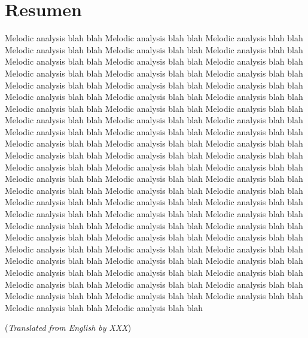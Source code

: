 
\chapter{Resumen}

Melodic analysis blah blah Melodic analysis blah blah Melodic analysis blah blah Melodic analysis blah blah Melodic analysis blah blah Melodic analysis blah blah Melodic analysis blah blah Melodic analysis blah blah Melodic analysis blah blah Melodic analysis blah blah Melodic analysis blah blah Melodic analysis blah blah Melodic analysis blah blah Melodic analysis blah blah Melodic analysis blah blah Melodic analysis blah blah Melodic analysis blah blah Melodic analysis blah blah Melodic analysis blah blah Melodic analysis blah blah Melodic analysis blah blah Melodic analysis blah blah Melodic analysis blah blah Melodic analysis blah blah Melodic analysis blah blah Melodic analysis blah blah Melodic analysis blah blah Melodic analysis blah blah Melodic analysis blah blah Melodic analysis blah blah Melodic analysis blah blah Melodic analysis blah blah Melodic analysis blah blah Melodic analysis blah blah Melodic analysis blah blah Melodic analysis blah blah Melodic analysis blah blah Melodic analysis blah blah Melodic analysis blah blah Melodic analysis blah blah Melodic analysis blah blah Melodic analysis blah blah Melodic analysis blah blah Melodic analysis blah blah Melodic analysis blah blah Melodic analysis blah blah Melodic analysis blah blah Melodic analysis blah blah Melodic analysis blah blah Melodic analysis blah blah Melodic analysis blah blah Melodic analysis blah blah Melodic analysis blah blah Melodic analysis blah blah Melodic analysis blah blah Melodic analysis blah blah Melodic analysis blah blah Melodic analysis blah blah Melodic analysis blah blah Melodic analysis blah blah Melodic analysis blah blah Melodic analysis blah blah Melodic analysis blah blah Melodic analysis blah blah Melodic analysis blah blah Melodic analysis blah blah Melodic analysis blah blah Melodic analysis blah blah Melodic analysis blah blah Melodic analysis blah blah Melodic analysis blah blah 


\vfill
{\small \noindent (\emph{Translated from English by XXX})}